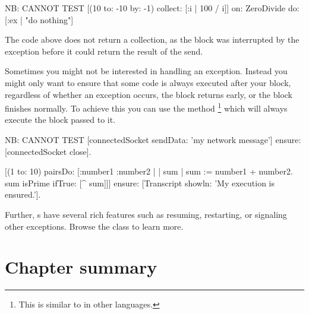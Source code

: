 \documentclass[a4paper,10pt,twoside]{book}
\begin{document}
\begin{code}{NB: CANNOT TEST}
[(10 to: -10 by: -1) collect: [:i | 100 / i]] 
   on: ZeroDivide
   do: [:ex | "do nothing"]
\end{code}

The code above does not return a collection, as the block was interrupted by the  exception before it could return the result of the  send.

Sometimes you might not be interested in handling an exception. 
Instead you might only want to ensure that some code is always executed after your block, regardless of whether an exception occurs, the block returns early, or the block finishes normally.
To achieve this you can use the method \footnote{This is similar to  in other languages.} which will always execute the block passed to it.

\begin{code}{NB: CANNOT TEST}
[connectedSocket sendData: 'my network message'] 
   ensure: [connectedSocket close].

[(1 to: 10) pairsDo: [:number1 :number2 | | sum |
	sum := number1 + number2.
	sum isPrime ifTrue: [^ sum]]]
		ensure: [Transcript showln: 'My execution is ensured.'].
\end{code}


Further, s have several rich features such as resuming, restarting, or signaling other exceptions. 
Browse the class  to learn more.


\section{Chapter summary}
\end{document}
